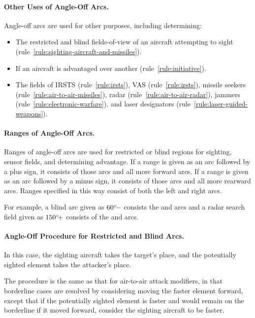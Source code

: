 {{\paragraph{Other Uses of Angle-Off Arcs.}
Angle-off arcs are used for other purposes, including determining:
\begin{itemize}
    \item The restricted and blind fields-of-view of an aircraft attempting to sight (rule~\ref{rule:sighting-aircraft-and-missiles}).
    \item If an aircraft is advantaged over another (rule~\ref{rule:initiative}).
    \item The fields of IRSTS (rule~\ref{rule:irsts}), VAS (rule~\ref{rule:irsts}), missile seekers (rule~\ref{rule:air-to-air-missiles}), radar (rule~\ref{rule:air-to-air-radar}), jammers (rule~\ref{rule:electronic-warfare}), and laser designators (rule~\ref{rule:laser-guided-weapons}).
\end{itemize}

\paragraph{Ranges of Angle-Off Arcs.}
\label{rule:ranges-of-angle-off-arcs}
Ranges of angle-off arcs are used for restricted or blind regions for sighting, sensor fields, and determining advantage. If a range is given as an arc followed by a plus sign, it consists of those arcs and all more forward arcs. If a range is given as an arc followed by a minus sign, it consists of those arcs and all more rearward arcs. Ranges specified in this way consist of both the left and right arcs.

For example, a blind arc given as $\mbox{$60{^\circ}\!-$}$ consists the  and  arcs and a radar search field given as $\mbox{$150{^\circ}\!+$}$ consists of the  and  arcs. 

\paragraph{Angle-Off Procedure for Restricted and Blind Arcs.}
In this case, the sighting aircraft takes the target's place, and the potentially sighted element takes the attacker's place. 

The procedure is the same as that for air-to-air attack modifiers, in that borderline cases are resolved by considering moving the faster element forward, except that if the potentially sighted element is faster and would remain on the borderline if it moved forward, consider the sighting aircraft to be faster.

}}
